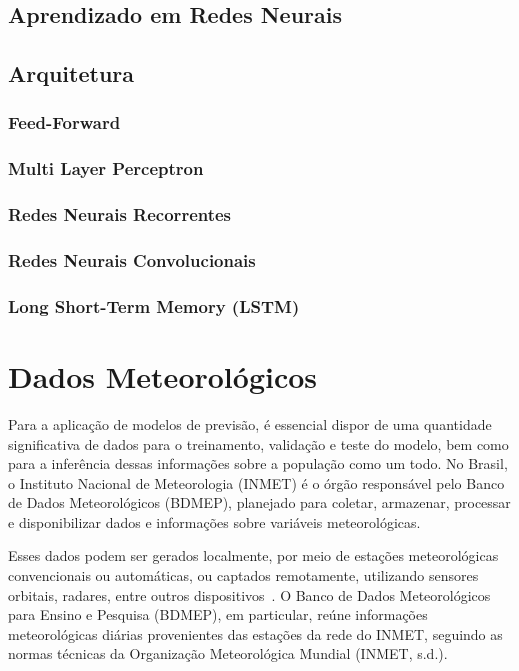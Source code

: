     \subsection{Aprendizado em Redes Neurais}
    \subsection{Arquitetura}
        \subsubsection{Feed-Forward}
        \subsubsection{Multi Layer Perceptron}
        \subsubsection{Redes Neurais Recorrentes}
        \subsubsection{Redes Neurais Convolucionais}
        \subsubsection{Long Short-Term Memory (LSTM)}


\section{Dados Meteorológicos}

    Para a aplicação de modelos de previsão, é essencial dispor de uma quantidade significativa de dados para o 
    treinamento, validação e teste do modelo, bem como para a inferência dessas informações sobre a população como um 
    todo. No Brasil, o Instituto Nacional de Meteorologia (INMET) é o órgão responsável pelo Banco de Dados 
    Meteorológicos (BDMEP), planejado para coletar, armazenar, processar e disponibilizar dados e informações sobre 
    variáveis meteorológicas. 
    
    Esses dados podem ser gerados localmente, por meio de estações meteorológicas convencionais ou automáticas, 
    ou captados remotamente, utilizando sensores orbitais, radares, entre outros dispositivos~\cite{vianna2017}. 
    O Banco de Dados Meteorológicos para Ensino e Pesquisa (BDMEP), em particular, reúne informações meteorológicas 
    diárias provenientes das estações da rede do INMET, seguindo as normas técnicas da Organização Meteorológica 
    Mundial (INMET, s.d.).